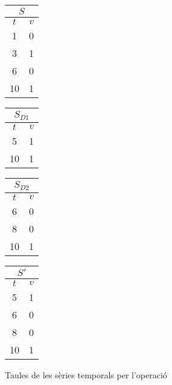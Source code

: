 \begin{example}
\begin{figure}[tp]
  \centering
  \begin{tabular}[c]{|c|c|}
    \multicolumn{2}{c}{$S$} \\ \hline
    $t$  & $v$ \\ \hline
    1  & 0 \\
    3  & 1 \\
    6  & 0 \\
    10  & 1 \\ \hline
  \end{tabular} \qquad
  \begin{tabular}[c]{|c|c|}
    \multicolumn{2}{c}{$S_{D1}$} \\ \hline
    $t$  & $v$ \\ \hline
    5  & 1 \\
    10  & 1 \\ \hline
  \end{tabular} \qquad
  \begin{tabular}[c]{|c|c|}
    \multicolumn{2}{c}{$S_{D2}$} \\ \hline
    $t$  & $v$ \\ \hline
    6  & 0 \\
    8  & 0 \\
    10  & 1 \\ \hline
  \end{tabular} \qquad
  \begin{tabular}[c]{|c|c|}
    \multicolumn{2}{c}{$S'$} \\ \hline
    $t$  & $v$ \\ \hline
    5  & 1 \\
    6  & 0 \\
    8  & 0 \\
    10  & 1 \\ \hline
  \end{tabular}
  \caption{Taules de les sèries temporals per l'operació }
  \label{fig:multiresolucio:multiresolucio}
\end{figure}
 


\end{example}









